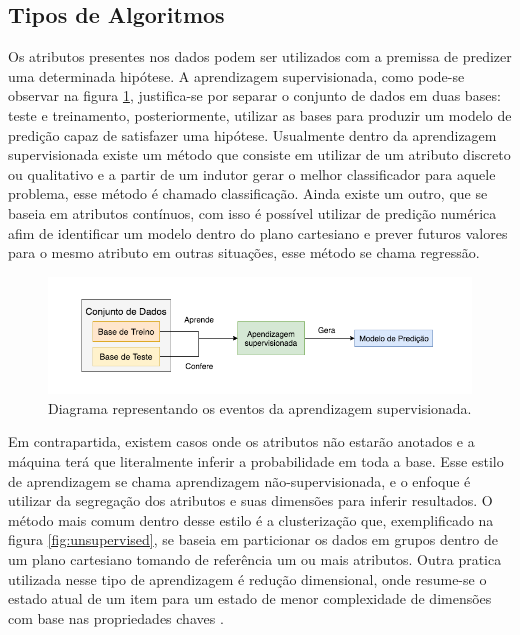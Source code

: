 \subsection{Tipos de Algoritmos}
Os atributos presentes nos dados podem ser utilizados com a premissa de predizer uma determinada hipótese. A aprendizagem supervisionada, como pode-se observar na figura \ref{fig:supervisedlearning}, justifica-se por separar o conjunto de dados em duas bases: teste e treinamento, posteriormente, utilizar as bases para produzir um modelo de predição capaz de satisfazer uma hipótese. Usualmente dentro da aprendizagem supervisionada existe um método que consiste em utilizar de um atributo discreto ou qualitativo e a partir de um indutor gerar o melhor classificador para aquele problema, esse método é chamado classificação. Ainda existe um outro, que se baseia em atributos contínuos, com isso é possível utilizar de predição numérica afim de identificar um modelo dentro do plano cartesiano e prever futuros valores para o mesmo atributo em outras situações, esse método se chama regressão. \cite{hastie2009unsupervised, russell2003artificial}

\begin{figure}
    \centering
    \includegraphics[width=.8\textwidth]{imagens/supervisedlearning.png}
    \caption{Diagrama representando os eventos da aprendizagem supervisionada.}
    \label{fig:supervisedlearning}
\end{figure}

Em contrapartida, existem casos onde os atributos não estarão anotados e a máquina terá que literalmente inferir a probabilidade em toda a base. Esse estilo de aprendizagem se chama aprendizagem não-supervisionada, e o enfoque é utilizar da segregação dos atributos e suas dimensões para inferir resultados. O método mais comum dentro desse estilo é a clusterização que, exemplificado na figura \ref{fig:unsupervised}, se baseia em particionar os dados em grupos dentro de um plano cartesiano tomando de referência um ou mais atributos. Outra pratica utilizada nesse tipo de aprendizagem é redução dimensional, onde resume-se o estado atual de um item para um estado de menor complexidade de dimensões com base nas propriedades chaves \cite{hastie2009unsupervised, mohri2012foundations}.

